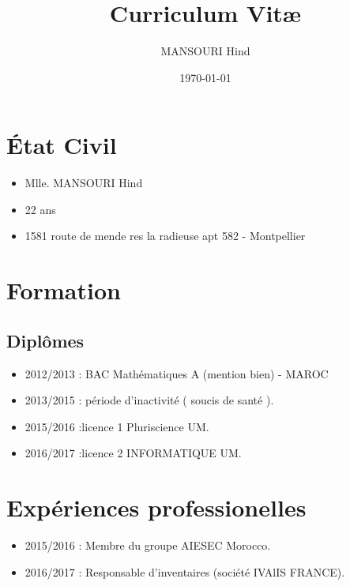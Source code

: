 \documentclass[a4paper]{article}
\title{Curriculum Vit\ae}
\author{MANSOURI Hind}
\date{\today}
\begin{document}
\maketitle

\section{\'Etat Civil}
    \begin{itemize}
        \item Mlle. MANSOURI Hind
        \item 22 ans
        \item 1581 route de mende res la radieuse apt 582 - Montpellier
       
    \end{itemize}

\section{Formation}
    \subsection{Diplômes}
        \begin{itemize}
            
            \item 2012/2013 : BAC Mathématiques A  (mention bien) - MAROC 
            \item 2013/2015 : période d'inactivité ( soucis de santé ).
            \item 2015/2016 :licence 1 Pluriscience UM.
            \item 2016/2017 :licence 2 INFORMATIQUE UM.
        \end{itemize}
   
       

\section{Expériences professionelles}
    \begin{itemize}
        \item 2015/2016 : Membre du groupe AIESEC Morocco.
        \item 2016/2017 : Responsable d'inventaires (société IVAlIS FRANCE).
        
    
    
    \end{itemize}
    
\end{document}
